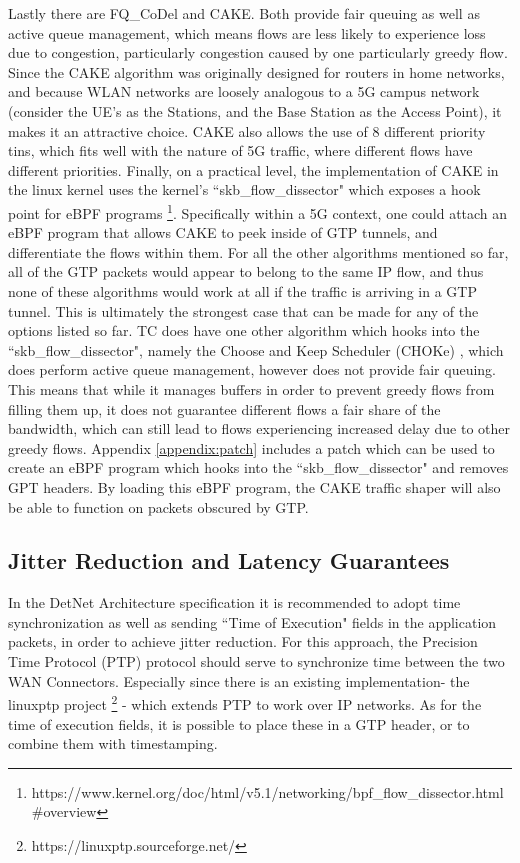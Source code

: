 Lastly there are FQ\_CoDel and CAKE. Both provide fair queuing as well as active queue management, which means flows are less likely to experience loss due to congestion, particularly congestion caused by one particularly greedy flow. Since the CAKE algorithm was originally designed for routers in home networks, and because WLAN networks are loosely analogous to a 5G campus network (consider the UE's as the Stations, and the Base Station as the Access Point), it makes it an attractive choice. CAKE also allows the use of 8 different priority tins, which fits well with the nature of 5G traffic, where different flows have different priorities. Finally, on a practical level, the implementation of CAKE in the linux kernel uses the kernel's “skb\_flow\_dissector" which exposes a hook point for eBPF programs \footnote{https://www.kernel.org/doc/html/v5.1/networking/bpf\_flow\_dissector.html\#overview}. Specifically within a 5G context, one could attach an eBPF program that allows CAKE to peek inside of GTP tunnels, and differentiate the flows within them. For all the other algorithms mentioned so far, all of the GTP packets would appear to belong to the same IP flow, and thus none of these algorithms would work at all if the traffic is arriving in a GTP tunnel. This is ultimately the strongest case that can be made for any of the options listed so far. TC does have one other algorithm which hooks into the “skb\_flow\_dissector", namely the Choose and Keep Scheduler (CHOKe) \cite{pan2000choke}, which does perform active queue management, however does not provide fair queuing. This means that while it manages buffers in order to prevent greedy flows from filling them up, it does not guarantee different flows a fair share of the bandwidth, which can still lead to flows experiencing increased delay due to other greedy flows. Appendix \ref{appendix:patch} includes a patch which can be used to create an eBPF program which hooks into the “skb\_flow\_dissector" and removes GPT headers. By loading this eBPF program, the CAKE traffic shaper will also be able to function on packets obscured by GTP.

\subsection{Jitter Reduction and Latency Guarantees}

In the DetNet Architecture specification it is recommended to adopt time synchronization as well as sending “Time of Execution" fields in the application packets, in order to achieve jitter reduction. For this approach, the Precision Time Protocol (PTP) protocol should serve to synchronize time between the two WAN Connectors. Especially since there is an existing implementation- the linuxptp project \footnote{https://linuxptp.sourceforge.net/} -  which extends PTP to work over IP networks. As for the time of execution fields, it is possible to place these in a GTP header, or to combine them with timestamping.

